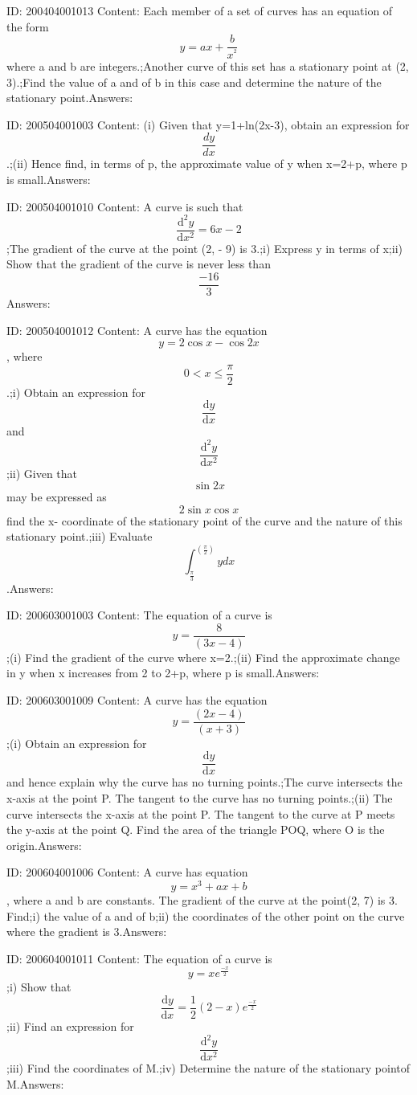 \documentclass{article}
\begin{document}
ID: 200404001013
Content:
Each member of a set of curves has an equation of the form $$y=ax+\frac{b}{x^{^{2}}}$$ where a and b are integers.;Another curve of this set has a stationary point at (2, 3).;Find the value of a and of b in this case and determine the nature of the stationary point.Answers:

ID: 200504001003
Content:
(i)	Given that y=1+ln(2x-3), obtain an expression for $$\frac{dy}{dx}$$.;(ii)	Hence find, in terms of p, the approximate value of y when x=2+p, where p is small.Answers:

ID: 200504001010
Content:
A curve is such that $$ \frac{\mathrm{d} ^{2}y}{\mathrm{d} x^{2}}=6x-2$$;The gradient of the curve at the point (2, - 9) is 3.;i) Express y in terms of x;ii) Show that the gradient of the curve is never less than $$\frac{-16}{3}$$Answers:

ID: 200504001012
Content:
A curve has the equation $$y = 2 \cos  x -\cos  2x$$, where $$0< x\leq\frac{\pi}{2}$$.;i) Obtain an expression for $$\frac{\mathrm{d} y}{\mathrm{d} x}$$ and $$\frac{\mathrm{d} ^{2}y}{\mathrm{d} x^{2}} $$;ii) Given that $$\sin  2x$$ may be expressed as $$2 \sin  x \cos  x$$ find the x- coordinate of the stationary point of the curve and the nature of this stationary point.;iii) Evaluate $$\int_{\frac{\pi}{3}}^{(\frac{\pi}{2})}y dx$$.Answers:

ID: 200603001003
Content:
The equation of a curve is $$y=\frac{8}{(3x-4)}$$;(i) Find the gradient of the curve where x=2.;(ii)	Find the approximate change in y when x increases from 2 to 2+p, where p is small.Answers:

ID: 200603001009
Content:
A curve has the equation $$y=\frac{(2x-4)}{ (x+3)} $$;(i) Obtain an expression for $$\frac{\mathrm{d} y}{\mathrm{d} x}$$ and hence explain why the curve has no turning points.;The curve intersects the x-axis at the point P. The tangent to the curve has no turning points.;(ii) The curve intersects the x-axis at the point P. The tangent to the curve at P meets the y-axis at the point Q. Find the area of the triangle POQ, where O is the origin.Answers:

ID: 200604001006
Content:
A curve has equation $$y=x^3+ax+b$$, where a and b are constants. The gradient of the curve at the point(2, 7) is 3. Find;i) the value of a and of b;ii) the coordinates of the other point on the curve where the gradient is 3.Answers:

ID: 200604001011
Content:
The equation of a curve is $$y=xe^{\frac{-x}{2}}$$;i) Show that $$\frac{\mathrm{d} y}{\mathrm{d} x}=\frac{1}{2} (2-x)e^{\frac{-x}{2}}$$;ii) Find an expression for $$\frac{\mathrm{d} ^{2}y}{\mathrm{d} x^{2}}$$;iii) Find the coordinates of M.;iv) Determine the nature of the stationary pointof M.Answers:
\end{document}
